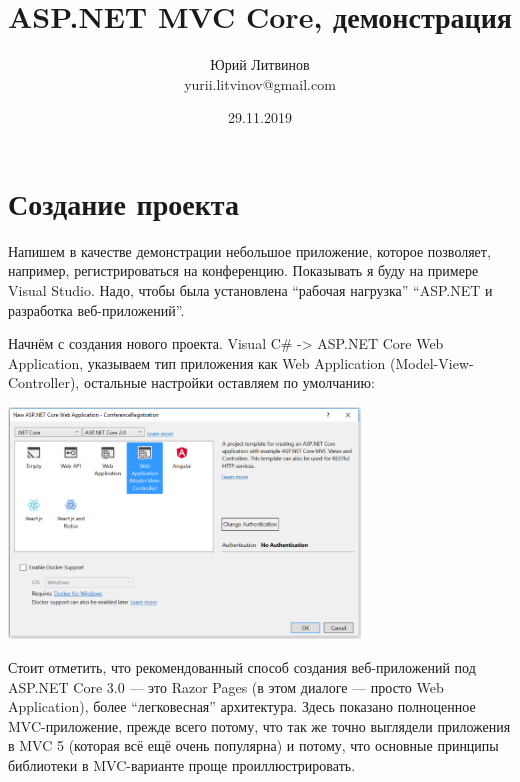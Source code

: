 \documentclass[a5paper]{article}
\title{ASP.NET MVC Core, демонстрация}
\author{Юрий Литвинов\\\small{yurii.litvinov@gmail.com}}
\date{29.11.2019}
\begin{document}
\maketitle
\thispagestyle{empty}

\section{Создание проекта}

Напишем в качестве демонстрации небольшое приложение, которое позволяет, например, регистрироваться на конференцию. Показывать я буду на примере Visual Studio. Надо, чтобы была установлена ``рабочая нагрузка'' ``ASP.NET и разработка веб-приложений''.

Начнём с создания нового проекта. Visual C\# -> ASP.NET Core Web Application, указываем тип приложения как Web Application (Model-View-Controller), остальные настройки оставляем по умолчанию:

\begin{center}
	\includegraphics[width=0.7\textwidth]{projectCreation.png}
\end{center}

Стоит отметить, что рекомендованный способ создания веб-приложений под ASP.NET Core 3.0 --- это Razor Pages (в этом диалоге --- просто Web Application), более ``легковесная'' архитектура. Здесь показано полноценное MVC-приложение,
прежде всего потому, что так же точно выглядели приложения в MVC 5 (которая всё ещё очень популярна) и потому, что основные принципы библиотеки в MVC-варианте проще проиллюстрировать.
\end{document}

